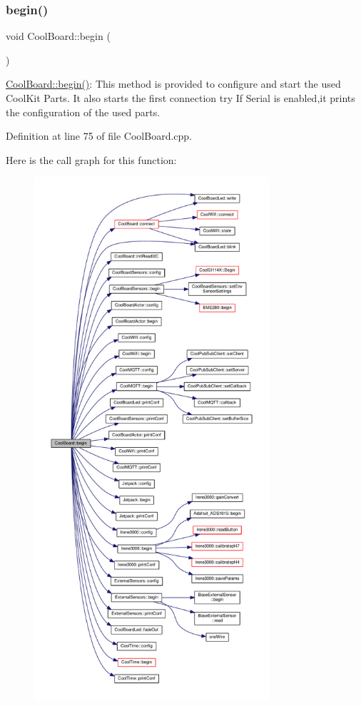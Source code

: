\subsubsection{\texorpdfstring{begin()}{begin()}}
{\footnotesize\ttfamily void Cool\+Board\+::begin (\begin{DoxyParamCaption}{ }\end{DoxyParamCaption})}

\hyperlink{class_cool_board_acba7c5aef7268b2c0044bdb54d3b9d76}{Cool\+Board\+::begin()}\+: This method is provided to configure and start the used Cool\+Kit Parts. It also starts the first connection try If Serial is enabled,it prints the configuration of the used parts. 

Definition at line 75 of file Cool\+Board.\+cpp.

Here is the call graph for this function\+:
\nopagebreak
\begin{figure}[H]
\begin{center}
\leavevmode
\includegraphics[height=550pt]{class_cool_board_acba7c5aef7268b2c0044bdb54d3b9d76_cgraph}
\end{center}
\end{figure}
\mbox{\label{class_cool_board_a583a874c09c07e70a6eb9229fc4beddb}} 

